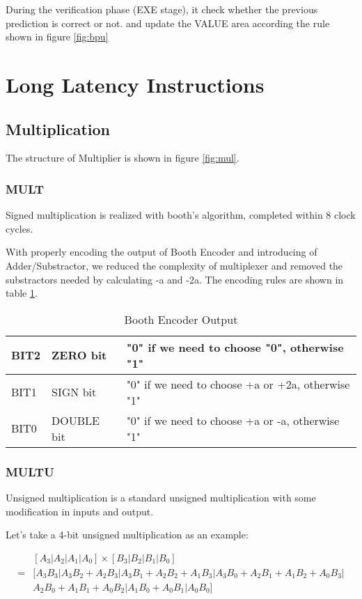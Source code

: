 During the verification phase (EXE stage), it check whether the previous prediction
is correct or not. and update the VALUE area according the rule shown in figure \ref{fig:bpu}

\section[Long Latency Instructions]{Long Latency Instructions}
\subsection[Multiplication]{Multiplication}
The structure of Multiplier is shown in figure \ref{fig:mul}.

\subsubsection[MULT]{MULT}
Signed multiplication is realized with booth's algorithm, completed within 8 clock cycles.

With properly encoding the output of Booth Encoder and introducing of Adder/Substractor,
we reduced the complexity of multiplexer and removed the substractors needed by calculating -a and -2a.
The encoding rules are shown in table \ref{tab:booth_enc}.

\begin{table}[!ht]
\centering
\caption{Booth Encoder Output}
\label{tab:booth_enc}
\begin{tabular}{|l|l|l|}
\hline
BIT2 & ZERO bit & "0" if we need to choose "0", otherwise "1"\\
\hline
BIT1 & SIGN bit & "0" if we need to choose +a or +2a, otherwise "1"\\
\hline
BIT0 & DOUBLE bit & "0" if we need to choose +a or -a, otherwise "1"\\
\hline
\end{tabular}
\end{table}

\subsubsection[MULTU]{MULTU}
Unsigned multiplication is a standard unsigned multiplication with some modification
in inputs and output.

Let's take a 4-bit unsigned multiplication as an example:

\begin{align*}
&[A_3|A_2|A_1|A_0] \times [B_3|B_2|B_1|B_0]\\
=&[A_3B_3|A_3B_2+A_2B_3|A_3B_1+A_2B_2+A_1B_3|A_3B_0+A_2B_1+A_1B_2+A_0B_3|\\
 &A_2B_0+A_1B_1+A_0B_2|A_1B_0+A_0B_1|A_0B_0]
\end{align*}

